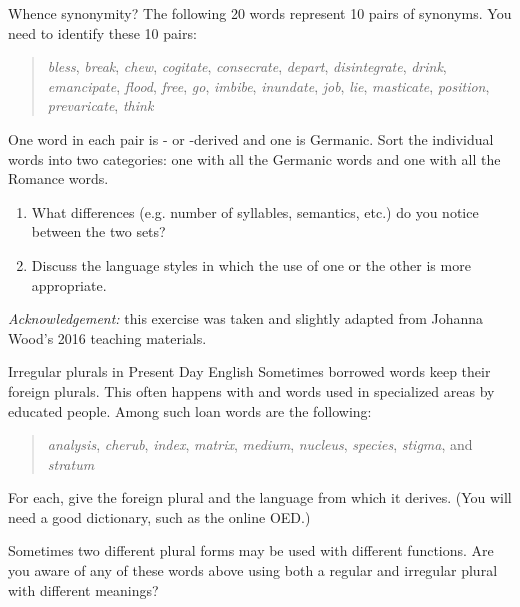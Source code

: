 \begin{exercises}{Whence synonymity?}\label{exercise-synonymity}
The following 20 words represent 10 pairs of synonyms. You need to identify these 10 pairs:

\begin{quote}
    \textit{bless}, \textit{break}, \textit{chew},  \textit{cogitate}, \textit{consecrate}, \textit{depart}, \textit{disintegrate}, \textit{drink}, \textit{emancipate},  \textit{flood}, \textit{free}, \textit{go}, \textit{imbibe}, \textit{inundate}, \textit{job}, \textit{lie}, \textit{masticate}, \textit{position}, \textit{prevaricate}, \textit{think}
\end{quote}

\noindent One word in each pair is - or -derived and one is Germanic. Sort the individual words into two categories: one with all the Germanic words and one with all the Romance words. 

\begin{enumerate}
\item What differences (e.g. number of syllables, semantics, etc.) do you notice between the two sets?
\item Discuss the language styles in which the use of one or the other is more appropriate.
\end{enumerate}

\noindent \emph{Acknowledgement:} this exercise was taken and slightly adapted from Johanna Wood's 2016 teaching materials.

\end{exercises}

\begin{exercises}{Irregular plurals in Present Day English}\label{exercise-irregular-plurals}
Sometimes borrowed words keep their foreign plurals. This often happens with  and  words used in specialized areas by educated people. Among such loan words are the following:

\begin{quote}
    \textit{analysis}, \textit{cherub}, \textit{index}, \textit{matrix}, \textit{medium}, \textit{nucleus}, \textit{species}, \textit{stigma}, and \textit{stratum}
\end{quote}

\noindent For each, give the foreign plural and the language from which it derives. (You will need a good dictionary, such as the online OED.)

Sometimes two different plural forms may be used with different functions. Are you aware of any of these words above using both a regular and irregular plural with different meanings?

\end{exercises}

